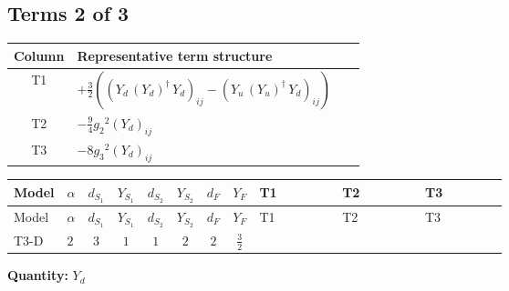 \documentclass[8pt]{article}
\begin{document}
\begin{landscape}
\subsection*{Terms 2 of 3}
\begin{center}
\begin{tabular}{@{}c >{\raggedright\arraybackslash}p{0.82\linewidth}@{}}
\toprule
Column & Representative term structure \\
\midrule
T1 & \(\displaystyle +\frac{3}{2} (\left({Y_d}\,\left({Y_d}\right)^{\dagger}\,{Y_d}\right)_{ij}-\left({Y_u}\,\left({Y_u}\right)^{\dagger}\,{Y_d}\right)_{ij})\) \\
\midrule
T2 & \(\displaystyle -\frac{9}{4} {g_2}^2 \left({Y_d}\right)_{ij}\) \\
\midrule
T3 & \(\displaystyle -8 {g_3}^2 \left({Y_d}\right)_{ij}\) \\
\midrule
\bottomrule
\end{tabular}
\end{center}
\smallskip
\tiny
\begin{longtable}{@{}llcccccc >{\raggedright\arraybackslash}p{0.21\linewidth} >{\raggedright\arraybackslash}p{0.21\linewidth} >{\raggedright\arraybackslash}p{0.21\linewidth}@{}}
\toprule
Model & $\alpha$ & $d_{S_1}$ & $Y_{S_1}$ & $d_{S_2}$ & $Y_{S_2}$ & $d_F$ & $Y_F$ & T1 & T2 & T3 \\
\midrule
\endfirsthead
\toprule
Model & $\alpha$ & $d_{S_1}$ & $Y_{S_1}$ & $d_{S_2}$ & $Y_{S_2}$ & $d_F$ & $Y_F$ & T1 & T2 & T3 \\
\midrule
\endhead
T3-D & $2$ & $3$ & $1$ & $1$ & $2$ & $2$ & $\frac{3}{2}$ & \scriptsize\adjustbox{max width=\linewidth}{$\begin{gathered} +\frac{3}{2} (\left({Y_d}\,\left({Y_d}\right)^{\dagger}\,{Y_d}\right)_{ij}-\left({Y_u}\,\left({Y_u}\right)^{\dagger}\,{Y_d}\right)_{ij})\end{gathered}$} & \scriptsize\adjustbox{max width=\linewidth}{$\begin{gathered} -\frac{9}{4} {g_2}^2 \left({Y_d}\right)_{ij}\end{gathered}$} & \scriptsize\adjustbox{max width=\linewidth}{$\begin{gathered} -8 {g_3}^2 \left({Y_d}\right)_{ij}\end{gathered}$} \\
\midrule
\bottomrule
\end{longtable}
\clearpage
\noindent\textbf{Quantity: }$Y_d$\par\smallskip

\end{landscape}
\end{document}
